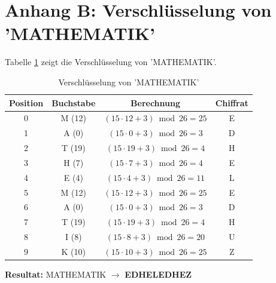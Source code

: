 ﻿\documentclass[12pt,a4paper]{article}
\begin{document}
	\section{Anhang B: Verschlüsselung von 'MATHEMATIK'}
	
	Tabelle \ref{tab:maths} zeigt die Verschlüsselung von 'MATHEMATIK'. 
	\begin{table}[H]
		\caption{Verschlüsselung von 'MATHEMATIK'}
		\label{tab:maths}
		\centering
		\begin{tabular}{|c|c|c|c|}
			\hline
			\textbf{Position} & \textbf{Buchstabe} & \textbf{Berechnung} & \textbf{Chiffrat} \\
			\hline
			0 & M (12) & $(15 \cdot 12 + 3) \bmod 26 = 25$ & E \\
			1 & A (0) & $(15 \cdot 0 + 3) \bmod 26 = 3$ & D \\
			2 & T (19) & $(15 \cdot 19 + 3) \bmod 26 = 4$ & H \\
			3 & H (7) & $(15 \cdot 7 + 3) \bmod 26 = 4$ & E \\
			4 & E (4) & $(15 \cdot 4 + 3) \bmod 26 = 11$ & L \\
			5 & M (12) & $(15 \cdot 12 + 3) \bmod 26 = 25$ & E \\
			6 & A (0) & $(15 \cdot 0 + 3) \bmod 26 = 3$ & D \\
			7 & T (19) & $(15 \cdot 19 + 3) \bmod 26 = 4$ & H \\
			8 & I (8) & $(15 \cdot 8 + 3) \bmod 26 = 20$ & U \\
			9 & K (10) & $(15 \cdot 10 + 3) \bmod 26 = 25$ & Z \\
			\hline
		\end{tabular}
	\end{table}
	\textbf{Resultat:} MATHEMATIK $\to$ \textbf{EDHELEDHEZ}
	
\end{document}
